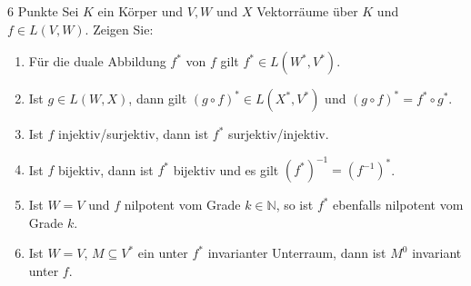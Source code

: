 \documentclass{problemset}
\begin{document}
\begin{problem}{6 Punkte}
Sei $K$ ein Körper und $V, W$ und $X$ Vektorräume über $K$ und $f \in L(V, W)$. Zeigen Sie:
\begin{enumerate}
    \item Für die duale Abbildung $f^*$ von $f$ gilt $f^* \in L(W^*, V^*)$.
    \item Ist $g \in L(W, X)$, dann gilt $(g \circ f)^* \in L(X^*, V^*)$ und
          $(g \circ f)^* = f^* \circ g^*$.
    \item Ist $f$ injektiv/surjektiv, dann ist $f^*$ surjektiv/injektiv.
    \item Ist $f$ bijektiv, dann ist $f^*$ bijektiv und es gilt $(f^*)^{-1} =
          (f^{-1})^*$.
    \item Ist $W = V$ und $f$ nilpotent vom Grade $k \in \mathbb{N}$, so ist
          $f^*$ ebenfalls nilpotent vom Grade $k$.
    \item Ist $W = V$, $M \subseteq V^*$ ein unter $f^*$ invarianter Unterraum,
          dann ist $M^0$ invariant unter $f$.
\end{enumerate}
\end{problem}
\end{document}
